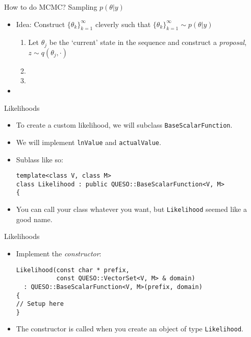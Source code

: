 \begin{frame}{How to do MCMC?  Sampling $p(\theta | y)$}
  \begin{itemize}
  \item Idea: Construct $\{ \theta_k \}_{k = 1}^{\infty}$ cleverly such that
    $\{ \theta_k \}_{k = 1}^{\infty} \sim p(\theta | y)$
    \begin{enumerate}
    \item Let $\theta_j$ be the `current' state in the sequence and construct a \textit{proposal}, $z \sim q(\theta_j, \cdot)$
    \item<2-> 
    \item<3-> 
    \end{enumerate}
  \item<4-> 
  \end{itemize}
\end{frame}

\begin{frame}[fragile]{Likelihoods}
  \begin{itemize}
    \item To create a custom likelihood, we will subclass \texttt{BaseScalarFunction}.
    \item We will implement \texttt{lnValue} and \texttt{actualValue}.
    \item Sublass like so:
      \begin{verbatim}
template<class V, class M>
class Likelihood : public QUESO::BaseScalarFunction<V, M>
{ \end{verbatim}
    \item You can call your class whatever you want, but \texttt{Likelihood}
      seemed like a good name.
  \end{itemize}
\end{frame}

\begin{frame}[fragile]{Likelihoods}
  \begin{itemize}
    \item Implement the \emph{constructor}:
      \begin{verbatim}
Likelihood(const char * prefix,
           const QUESO::VectorSet<V, M> & domain)
  : QUESO::BaseScalarFunction<V, M>(prefix, domain)
{
// Setup here
} \end{verbatim}
    \item The constructor is called when you create an object of type
      \texttt{Likelihood}.
  \end{itemize}
\end{frame}

